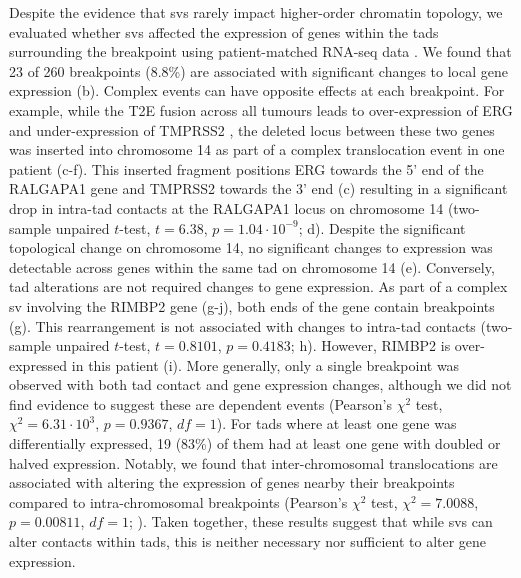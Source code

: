 Despite the evidence that \glspl{sv} rarely impact higher-order chromatin topology, we evaluated whether \glspl{sv} affected the expression of genes within the \glspl{tad} surrounding the breakpoint using patient-matched RNA-seq data \cite{chenWidespreadFunctionalRNA2019}.
We found that 23 of 260 breakpoints (8.8\%) are associated with significant changes to local gene expression (b).
Complex events can have opposite effects at each breakpoint.
For example, while the T2E fusion across all tumours leads to over-expression of ERG and under-expression of TMPRSS2 \cite{fraserGenomicHallmarksLocalized2017,kronTMPRSS2ERGFusion2017}, the deleted locus between these two genes was inserted into chromosome 14 as part of a complex translocation event in one patient (c-f).
This inserted fragment positions ERG towards the 5' end of the RALGAPA1 gene and TMPRSS2 towards the 3' end (c) resulting in a significant drop in intra-\gls{tad} contacts at the RALGAPA1 locus on chromosome 14 (two-sample unpaired $t$-test, $t = 6.38$, $p = 1.04 \cdot 10^{-9}$; d).
Despite the significant topological change on chromosome 14, no significant changes to expression was detectable across genes within the same \gls{tad} on chromosome 14 (e).
Conversely, \gls{tad} alterations are not required changes to gene expression.
As part of a complex \gls{sv} involving the RIMBP2 gene (g-j), both ends of the gene contain breakpoints (g).
This rearrangement is not associated with changes to intra-\gls{tad} contacts (two-sample unpaired $t$-test, $t = 0.8101$, $p = 0.4183$; h).
However, RIMBP2 is over-expressed in this patient (i).
More generally, only a single breakpoint was observed with both \gls{tad} contact and gene expression changes, although we did not find evidence to suggest these are dependent events (Pearson's $\chi^2$ test, $\chi^2 = 6.31 \cdot 10^3$, $p = 0.9367$, $df = 1$).
For \glspl{tad} where at least one gene was differentially expressed, 19 (83\%) of them had at least one gene with doubled or halved expression.
Notably, we found that inter-chromosomal translocations are associated with altering the expression of genes nearby their breakpoints compared to intra-chromosomal breakpoints (Pearson's $\chi^2$ test, $\chi^2 = 7.0088$, $p = 0.00811$, $df = 1$; ).
Taken together, these results suggest that while \glspl{sv} can alter contacts within \glspl{tad}, this is neither necessary nor sufficient to alter gene expression.

